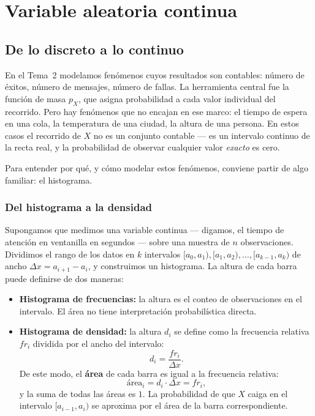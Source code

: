 \documentclass[12pt, a4paper]{book}
\numberwithin{equation}{chapter}
\begin{document}
\chapter{Variable aleatoria continua}

\section{De lo discreto a lo continuo}


En el Tema~2 modelamos fenómenos cuyos resultados son contables:
número de éxitos, número de mensajes, número de fallas. La herramienta
central fue la función de masa $p_X$, que asigna probabilidad a cada
valor individual del recorrido. Pero hay fenómenos que no encajan en
ese marco: el tiempo de espera en una cola, la temperatura de una
ciudad, la altura de una persona. En estos casos el recorrido de $X$
no es un conjunto contable --- es un intervalo continuo de la recta
real, y la probabilidad de observar cualquier valor \emph{exacto} es
cero.

Para entender por qué, y cómo modelar estos fenómenos, conviene
partir de algo familiar: el histograma.

\subsection{Del histograma a la densidad}

Supongamos que medimos una variable continua --- digamos, el tiempo
de atención en ventanilla en segundos --- sobre una muestra de $n$
observaciones. Dividimos el rango de los datos en $k$ intervalos
$[a_0, a_1), [a_1, a_2), \ldots, [a_{k-1}, a_k)$ de ancho $\Delta x
= a_{i+1} - a_i$, y construimos un histograma. La altura de cada
barra puede definirse de dos maneras:

\begin{itemize}[leftmargin=2em]
	\item \textbf{Histograma de frecuencias:} la altura es el conteo
	de observaciones en el intervalo. El área no tiene interpretación
	probabilística directa.
	\item \textbf{Histograma de densidad:} la altura $d_i$ se define
	como la frecuencia relativa $fr_i$ dividida por el ancho del
	intervalo:
	\[
	d_i = \frac{fr_i}{\Delta x}.
	\]
	De este modo, el \textbf{área} de cada barra es igual a la
	frecuencia relativa:
	\[
	\text{área}_i = d_i \cdot \Delta x = fr_i,
	\]
	y la suma de todas las áreas es $1$. La probabilidad de que $X$
	caiga en el intervalo $[a_{i-1}, a_i)$ se aproxima por el área
	de la barra correspondiente.
\end{itemize}
\end{document}
